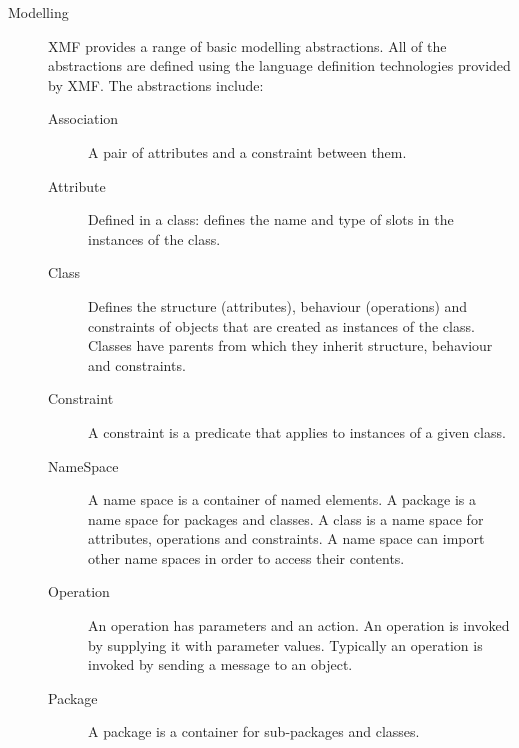 \documentclass{article}
\begin{document}
\begin{description}
\item[Modelling]
XMF provides a range of basic modelling abstractions. All of the abstractions are
defined using the language definition technologies provided by XMF. The abstractions
include:
\begin{description}
\item[Association]
A pair of attributes and a constraint between them.
\item[Attribute] 
Defined in a class: defines the name and type of slots in the instances of the class.
\item[Class]
Defines the structure (attributes), behaviour (operations) and constraints
of objects that are created as instances of the
class. Classes have parents from which they inherit structure, behaviour and constraints.
\item[Constraint]
A constraint is a predicate that applies to instances of a given class.
\item[NameSpace]
A name space is a container of named elements. A package is a name space for packages and
classes. A class is a name space for attributes, operations and constraints. A name space
can import other name spaces in order to access their contents.
\item[Operation]
An operation has parameters and an action. An operation is invoked by supplying it with
parameter values. Typically an operation is invoked by sending a message to an object.
\item[Package]
A package is a container for sub-packages and classes.
\end{description}


\end{description}
\end{document}
